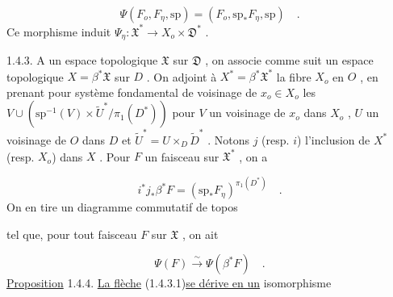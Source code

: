 \begin{equation*}
\Psi(F_o, F_\eta , \mathrm{sp}) = (F_o, \mathrm{sp}_* F_\eta , \mathrm{sp}) \quad .
\end{equation*}
Ce morphisme induit $\Psi_\eta : \mathfrak{X}^* \longrightarrow X_o \times \mathfrak{D}^*$ .

1.4.3. A un espace topologique $\mathfrak{X}$ sur $\mathfrak{D}$ , on associe comme suit un espace topologique $X = \beta^* \mathfrak{X}$ sur $D$ . On adjoint à $X^* = \beta^* \mathfrak{X}^*$ la fibre $X_o$ en $O$ , en prenant pour système fondamental de voisinage de $x_o \in X_o$ les $V \cup (\mathrm{sp}^{-1}(V) \times \widetilde{U}^*/\pi_1(D^*))$ pour $V$ un voisinage de $x_o$ dans $X_o$ , $U$ un voisinage de $O$ dans $D$ et $\widetilde{U}^* = U \times_D \widetilde{D}^*$ . Notons $j$ (resp. $i$) l'inclusion de $X^*$ (resp. $X_o$) dans $X$ . Pour $F$ un faisceau sur $\mathfrak{X}^*$ , on a

\begin{equation*}
i^* j_* \beta^* F = (\mathrm{sp}_* F_\eta)^{\pi_1(D^*)} \quad .
\end{equation*}
On en tire un diagramme commutatif de topos

\begin{center}
\end{center}
tel que, pour tout faisceau $F$ sur $\mathfrak{X}$ , on ait

\begin{equation}\tag{1.4.3.1}
\Psi(F) \stackrel{\sim}{\longrightarrow} \Psi(\beta^* F) \quad .
\end{equation}
\underline{Proposition} 1.4.4. \underline{La flèche} (1.4.3.1)\underline{se dérive en un} isomorphisme


